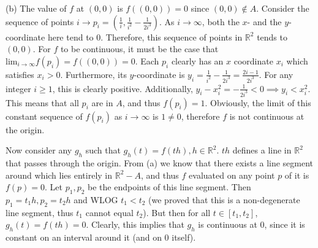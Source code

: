 \begin{solution}
        (b) The value of $f$ at $(0, 0)$ is $f((0,0)) = 0$ since $(0,0) \notin A$. Consider the sequence of points $i \rightarrow p_i = (\frac{1}{i}, \frac{1}{i^2} - \frac{1}{2i^3})$. As $i \rightarrow \infty$, both the $x$- and the $y$-coordinate here tend to 0. Therefore, this sequence of points in $\mathbb{R}^2$ tends to $(0, 0)$. For $f$ to be continuous, it must be the case that $\text{lim}_{i \rightarrow \infty} f(p_i) = f((0,0)) = 0$. Each $p_i$ clearly has an $x$ coordinate $x_i$ which satisfies $x_i > 0$. Furthermore, its $y$-coordinate is $y_i = \frac{1}{i^2} - \frac{1}{2i^3} = \frac{2i - 1}{2i^3}$. For any integer $i \geq 1$, this is clearly positive. Additionally, $y_i - x_i^2 = -\frac{1}{2i^3} < 0 \implies y_i < x_i^2$. This means that all $p_i$ are in $A$, and thus $f(p_i) = 1$. Obviously, the limit of this constant sequence of $f(p_i)$ as $i \rightarrow \infty$ is $1 \neq 0$, therefore $f$ is not continuous at the origin.

        Now consider any $g_h$ such that $g_h(t) = f(th), h \in \mathbb{R}^2$. $th$ defines a line in $\mathbb{R}^2$ that passes through the origin. From (a) we know that there exists a line segment around which lies entirely in $\mathbb{R}^2 - A$, and thus $f$ evaluated on any point $p$ of it is $f(p) = 0$. Let $p_1, p_2$ be the endpoints of this line segment. Then $p_1 = t_1h, p_2 = t_2h$ and WLOG $t_1 < t_2$ (we proved that this is a non-degenerate line segment, thus $t_1$ cannot equal $t_2$). But then for all $t \in [t_1, t_2]$, $g_h(t) = f(th) = 0$. Clearly, this implies that $g_h$ is continuous at 0, since it is constant on an interval around it (and on 0 itself).
    \end{solution}